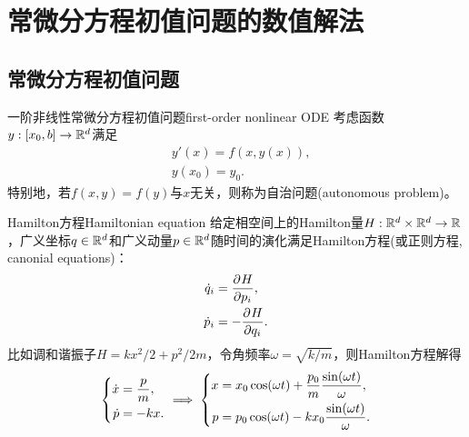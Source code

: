 \chapter{常微分方程初值问题的数值解法}
\label{chap:ordinary differential equation}

\section{常微分方程初值问题}

\begin{definition}
    {一阶非线性常微分方程初值问题}{first-order nonlinear ODE}
    考虑函数$y:[x_0,b]\to\mathbb R^d$满足
    \begin{subequations}
        \label{eqn:ode}
        \begin{align}
            \label{eqn:ode eq}
            &y'(x)=f(x,y(x)),\\
            &y(x_0)=y_0.
        \end{align}
    \end{subequations}
    特别地，若$f(x,y)=f(y)$与$x$无关，则称为自治问题(autonomous problem)。
\end{definition}

\begin{example}
    {Hamilton方程}{Hamiltonian equation}
    给定相空间上的Hamilton量$H:\mathbb R^d\times\mathbb R^d\to\mathbb R$，广义坐标$q\in\mathbb R^d$和广义动量$p\in\mathbb R^d$随时间的演化满足Hamilton方程(或正则方程, canonial equations)：
    \begin{subequations}
        \begin{align}
            \dot q_i&=\frac{\partial^{{}}H}{\partial{p_i}^{{}}},\\
            \dot p_i&=-\frac{\partial^{{}}H}{\partial{q_i}^{{}}}.
        \end{align}
    \end{subequations}
    比如调和谐振子$H=kx^2/2+p^2/2m$，令角频率$\omega=\sqrt{k/m}$，则Hamilton方程解得
    \[
        \left\{\begin{aligned}
            \dot x&=\frac pm,\\
            \dot p&=-kx.
        \end{aligned}\right.\implies
        \left\{\begin{aligned}
            x&=x_0\cos(\omega t)+\frac{p_0}m\frac{\sin(\omega t)}\omega,\\
            p&=p_0\cos(\omega t)-kx_0\frac{\sin(\omega t)}\omega.
        \end{aligned}\right.
    \]
\end{example}

